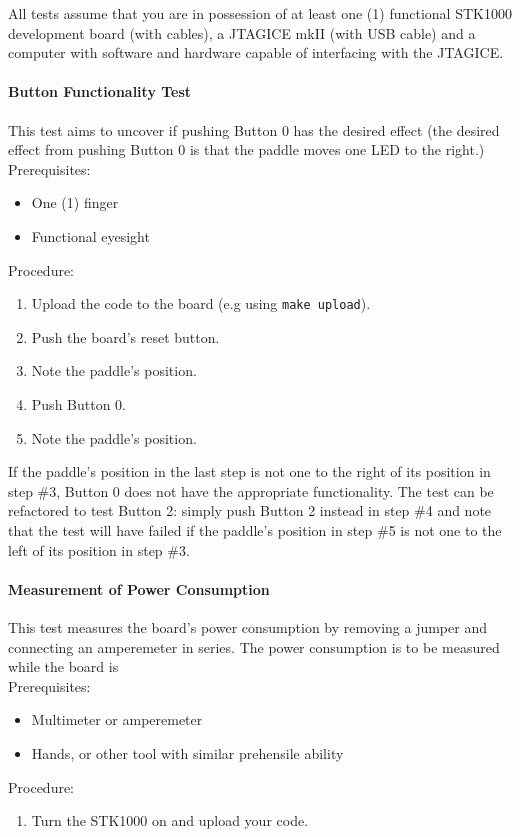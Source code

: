 All tests assume that you are in possession of at least one (1) functional STK1000 development board (with cables), a JTAGICE mkII (with USB cable) and a computer with software and hardware capable of interfacing with the JTAGICE.
\paragraph{Button Functionality Test}
This test aims to uncover if pushing Button 0 has the desired effect (the desired effect from pushing Button 0 is that the paddle moves one LED to the right.)
\\ Prerequisites:
\begin{itemize}
	\item One (1) finger
	\item Functional eyesight
\end{itemize}
Procedure:
\begin{enumerate}
	\item Upload the code to the board (e.g using \texttt{make upload}).
	\item Push the board's reset button.
	\item Note the paddle's position.
	\item Push Button 0.
	\item Note the paddle's position.
\end{enumerate}
If the paddle's position in the last step is not one to the right of its position in step \#3, Button 0 does not have the appropriate functionality.
The test can be refactored to test Button 2: simply push Button 2 instead in step \#4 and note that the test will have failed if the paddle's position in step \#5 is not one to the left of its position in step \#3.

\paragraph{Measurement of Power Consumption}
This test measures the board's power consumption by removing a jumper and connecting an amperemeter in series.
The power consumption is to be measured while the board is 
\\
Prerequisites:
\begin{itemize}
	\item{Multimeter or amperemeter}
	\item{Hands, or other tool with similar prehensile ability}
\end{itemize}
Procedure:
\begin{enumerate}
	\item{Turn the STK1000 on and upload your code.}

\end{enumerate}
